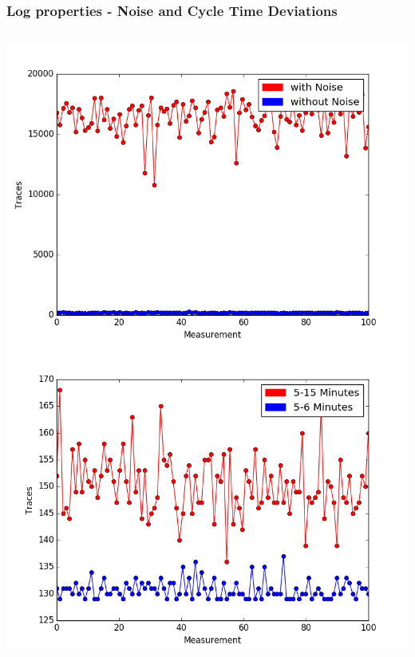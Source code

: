 \documentclass{beamer}
\begin{document}
\begin{frame}
\frametitle{Log properties - Noise and Cycle Time Deviations}
\centering
\begin{columns}
\includegraphics[width=0.95\linewidth]{img/Noise_Noiseless.png}
\includegraphics[width=0.95\linewidth]{img/high_vs_low_deviation.png}
\end{columns}
\end{frame}
\end{document}
